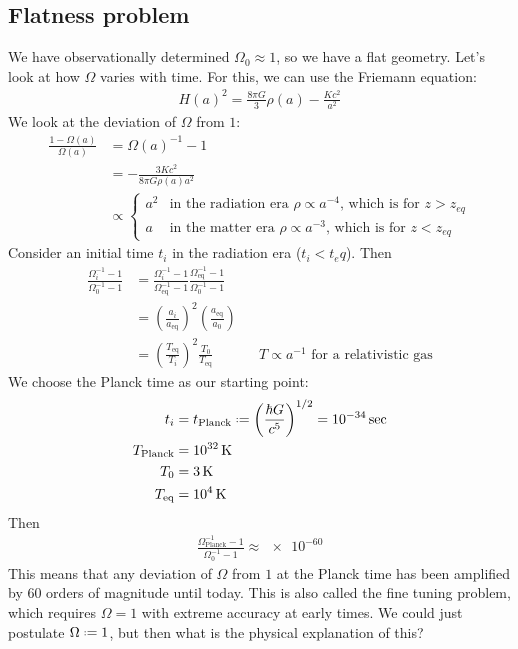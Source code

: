 \subsection{Flatness problem}
We have observationally determined $\Omega_0 \approx 1$, so we have a flat geometry. Let's look at how $\Omega$ varies with time. For this, we can use the Friemann equation:
\begin{align*}
	H(a)^2 = \frac{8\pi G}{3} \rho(a) - \frac{Kc^2}{a^2}
\end{align*}
We look at the deviation of $\Omega$ from $1$:
\begin{align*}
	\frac{1 - \Omega(a)}{\Omega(a)}
	&= \Omega(a)^{-1} - 1\\
	&= -\frac{3Kc^2}{8\pi G \rho(a)a^2}\\
	&\propto
	\begin{cases}
		a^2 &\text{in the radiation era } \rho \propto a^{-4} \text{, which is for } z > z_{eq}\\
		a & \text{in the matter era } \rho \propto a^{-3} \text{, which is for } z < z_{eq}
	\end{cases}
\end{align*}
Consider an initial time $t_i$ in the radiation era ($t_i < t_eq$).
Then
\begin{align*}
	\frac{\Omega_i^{-1} - 1}{\Omega_0^{-1} - 1}
	&= \frac{\Omega_i^{-1} - 1}{\Omega_\text{eq}^{-1} -1}
	\frac{\Omega_\text{eq}^{-1}-1}{\Omega_0^{-1}-1}\\
	&= 
	\left( \frac{a_i}{a_\text{eq}} \right)^2 
	\left( \frac{a_\text{eq}}{a_0} \right)\\
	&= \left( \frac{T_\text{eq}}{T_i} \right)^2
	\frac{T_0}{T_\text{eq}}
	&& T \propto a^{-1} \text{ for a relativistic gas}
\end{align*}
We choose the Planck time as our starting point:
\begin{align*}
	t_i &= t_\text{Planck}
	\defeq 
	\left( \frac{\hbar G}{c^5} \right)^{1/2} = \SI{e-34}{\sec}\\
	T_\text{Planck} &= \SI{e32}{\kelvin}\\
	T_0 &= \SI{3}{\kelvin}\\
	T_\text{eq} &= \SI{e4}{\kelvin} 
\end{align*}
Then
\begin{align*}
	\frac{\Omega_\text{Planck}^{-1} - 1}{\Omega_0^{-1}-1} \approx \num{e-60}
\end{align*}
This means that any deviation of $\Omega$ from $1$ at the Planck time has been amplified by $60$ orders of magnitude until today. This is also called the fine tuning problem, which requires $\Omega=1$ with extreme accuracy at early times. We could just postulate $\Omega \defeq 1$, but then what is the physical explanation of this?


